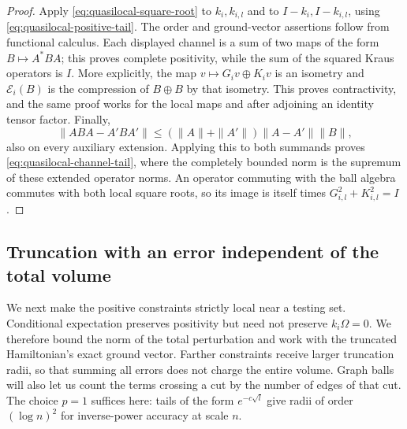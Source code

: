 \begin{proof}
Apply \eqref{eq:quasilocal-square-root} to $k_i,k_{i,l}$ and to
$I-k_i,I-k_{i,l}$, using \eqref{eq:quasilocal-positive-tail}.
The order and ground-vector assertions follow from functional calculus.
Each displayed channel is a sum of two maps of the form $B\mapsto A^*BA$;
this proves complete positivity, while the sum of the squared Kraus
operators is $I$.  More explicitly, the map
$v\mapsto G_iv\oplus K_iv$ is an isometry and
$\mathcal E_i(B)$ is the compression of $B\oplus B$ by that isometry.
This proves contractivity, and the same proof works for the local maps and
after adjoining an identity tensor factor.  Finally,
\[
 \|ABA-A'BA'\|
 \le(\|A\|+\|A'\|)\|A-A'\|\|B\|,
\]
also on every auxiliary extension.  Applying this to both summands proves
\eqref{eq:quasilocal-channel-tail}, where the completely bounded norm is
the supremum of these extended operator norms.  An operator commuting
with the ball algebra commutes with both local square roots, so its image
is itself times $G_{i,l}^2+K_{i,l}^2=I$.
\end{proof}

\subsection{Truncation with an error independent of the total volume}

We next make the positive constraints strictly local near a testing set.
Conditional expectation preserves positivity but need not preserve
$k_i\Omega=0$.  We therefore bound the norm of the total perturbation and
work with the truncated Hamiltonian's exact ground vector.  Farther
constraints receive larger truncation radii, so that summing all errors
does not charge the entire volume.  Graph balls will also let us count the
terms crossing a cut by
the number of edges of that cut.  The choice $p=1$ suffices here: tails
of the form $e^{-c\sqrt l}$ give radii of order $(\log n)^2$ for
inverse-power accuracy at scale $n$.

